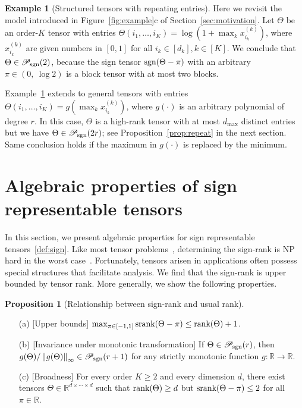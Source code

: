 \documentclass[twoside,11pt]{article}
\theoremstyle{definition}
\newtheorem{prop}{Proposition}
\newtheorem{example}{Example}
\def\sign{\textup{sgn}}
\def\srank{\textup{srank}}
\def\rank{\textup{rank}}
\def\caliP{\mathscr{P}_{\textup{sgn}}}
\begin{document}
\begin{example}[Structured tensors with repeating entries]\label{eq:example} Here we revisit the model introduced in Figure~\ref{fig:example}c of Section~\ref{sec:motivation}. Let $\Theta$ be an order-$K$ tensor with entries $\Theta(i_1,\ldots,i_K)=\log(1+\max_kx^{(k)}_{i_k})$, where $x^{(k)}_{i_k}$ are given numbers in $[0,1]$ for all $i_k\in[d_k], k\in[K]$. We conclude that $\Theta \in \caliP(2)$, because the sign tensor $\sign(\Theta-\pi)$ with an arbitrary $\pi\in(0,\ \log 2)$ is a block tensor with at most two blocks. 

Example~\ref{eq:example} extends to general tensors with entries $\Theta(i_1,\ldots,i_K)=g(\max_kx^{(k)}_{i_k})$, where $g(\cdot)$ is an arbitrary polynomial of degree $r$. In this case, $\Theta$ is a high-rank tensor with at most $d_{\max}$ distinct entries but we have $\Theta\in \caliP(2r)$; see Proposition~\ref{prop:repeat} in the next section. Same conclusion holds if the maximum in $g(\cdot)$ is replaced by the minimum. 
\end{example}


\section{Algebraic properties of sign representable tensors}\label{sec:algebry}
In this section, we present algebraic properties for sign representable tensors~\eqref{def:sign}. 
Like most tensor problems~\citep{hillar2013most}, determining the sign-rank is NP hard in the worst case~\citep{alon2016sign}. Fortunately, tensors arisen in applications often possess special structures that facilitate analysis. We find that the sign-rank is upper bounded by tensor rank. More generally, we show the following properties.

\begin{prop}[Relationship between sign-rank and usual rank]~\label{cor:monotonic} \hfill
\begin{enumerate}[label={2.\arabic*},wide, labelwidth=!, labelindent=0pt,itemsep=0ex,parsep=0ex,topsep=-7pt]
\item[(a)] [Upper bounds] $\max_{\pi\in[-1,1]}\srank(\Theta-\pi)\leq \rank(\Theta)+1$.
\item[(b)] [Invariance under monotonic transformation] If $\Theta \in \caliP(r)$, then $g(\Theta)/\mnorm{g(\Theta)}\in\caliP(r+1)$ for any strictly monotonic function $g\colon \mathbb{R}\to \mathbb{R}$.\item[(c)] [Broadness] For every order $K\geq 2$ and every dimension $d$, there exist tensors $\Theta\in\mathbb{R}^{d\times \cdots \times d}$ such that $\rank(\Theta)\geq d$ but $\srank(\Theta-\pi)\leq 2$ for all $\pi\in\mathbb{R}$.  
\end{enumerate}
\end{prop}
\end{document}
